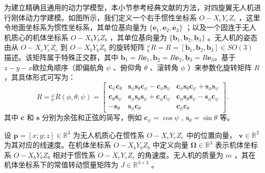 为建立精确且通用的动力学模型，本小节参考经典文献\parencite{6289431}的方法，对四旋翼无人机进行刚体动力学建模。如图所示，我们定义一个右手惯性坐标系   $O - X_eY_eZ_e$ ，这里令地面坐标系为惯性坐标系，其单位基向量为  $ \{\mathbf{e}_1, \mathbf{e}_2, \mathbf{e}_3\} $ ；以及一个固连于无人机质心的机体坐标系  $ O - X_bY_bZ_b $ ，其单位基向量为  $ \{\mathbf{b}_1, \mathbf{b}_2, \mathbf{b}_3\} $ 。无人机的姿态由从  $ O - X_eY_eZ_e $  到  $ O - X_bY_bZ_b $  的旋转矩阵  $ {}_b^\omega R = R = [{\mathbf{b}}_1,{\mathbf{b}}_2,{\mathbf{b}}_3]\in SO(3) $  描述。该矩阵属于特殊正交群，其中 $ \mathbf{b}_1 = R \mathbf{e}_1,  \mathbf{b}_2 = R \mathbf{e}_2, \mathbf{b}_3 = R \mathbf{e}_3 $。基于$ z-y-x $欧拉角顺序（即偏航角  $ \psi $ 、俯仰角  $ \theta $ 、滚转角  $ \phi $ ）来参数化旋转矩阵 $ {R} $ ，其具体形式可写为：
\begin{equation}
	{R} = {}_b^\omega R(\phi,\theta,\psi) = 
	\begin{bmatrix}
		\mathbf{c}_\psi \mathbf{c}_\theta & 
		\mathbf{s}_\phi \mathbf{s}_\theta \mathbf{c}_\psi - \mathbf{c}_\phi \mathbf{s}_\psi & 
		\mathbf{c}_\phi \mathbf{s}_\theta \mathbf{c}_\psi + \mathbf{s}_\phi \mathbf{s}_\psi \\
		\mathbf{c}_\theta \mathbf{s}_\psi & 
		\mathbf{s}_\phi \mathbf{s}_\theta \mathbf{s}_\psi + \mathbf{c}_\phi \mathbf{c}_\psi & 
		\mathbf{c}_\phi \mathbf{s}_\theta \mathbf{s}_\psi - \mathbf{s}_\phi \mathbf{c}_\psi \\
		-\mathbf{s}_\theta & 
		\mathbf{s}_\phi \mathbf{c}_\theta  & 
		\mathbf{c}_\phi \mathbf{c}_\theta
	\end{bmatrix}.
	\label{旋转矩阵}
\end{equation}
其中  $ \mathbf{c} $  和  $ \mathbf{s} $  分别为余弦和正弦的简写，例如  $ \mathbf{c}_\psi = \cos\psi $ ,  $ \mathbf{s}_\theta = \sin\theta $  等。

设  $\mathbf{p}=[x;y;z] \in \mathbb{R}^3 $  为无人机质心在惯性系  $O - X_eY_eZ_e$  中的位置向量， $ \mathbf{v} \in \mathbb{R}^3 $  为其对应的线速度。在机体坐标系 $ O - X_bY_bZ_b $ 中定义向量  $ \boldsymbol{\Omega} \in \mathbb{R}^3 $  表示机体坐标系  $ O - X_bY_bZ_b $  相对于惯性系  $ O - X_eY_eZ_e $  的角速度。无人机的质量为  $ m $ ，其在机体坐标系下的常值转动惯量矩阵为  $ {J} \in \mathbb{R}^{3 \times 3} $ 。

